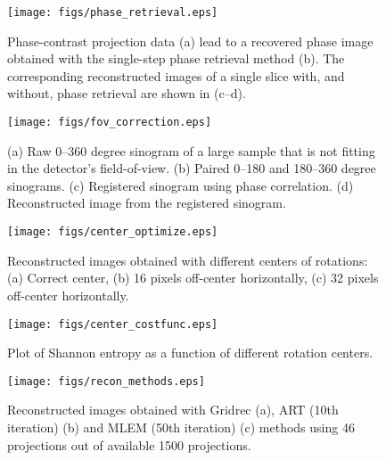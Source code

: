 \documentclass[pdf]{iucr}              %
\begin{document}
\begin{figure}
\centering
\texttt{[image: figs/phase\_retrieval.eps]}
\caption{Phase-contrast projection data (a) lead to a recovered phase image obtained with the single-step phase retrieval method (b). The corresponding reconstructed images of a single slice with, and without, phase retrieval are shown in (c--d).}
\label{fig:ProcessPhase}
\end{figure}

\begin{figure}
\centering
\texttt{[image: figs/fov\_correction.eps]}
\caption{(a) Raw 0--360 degree sinogram of a large sample that is not fitting in the detector's field-of-view. (b) Paired 0--180 and 180--360 degree sinograms. (c) Registered sinogram using phase correlation. (d) Reconstructed image from the registered sinogram.}
\label{fov_correction}
\end{figure}

\begin{figure}
\centering
\texttt{[image: figs/center\_optimize.eps]}
\caption{Reconstructed images obtained with different centers of rotations: (a) Correct center, (b) 16 pixels  off-center horizontally, (c) 32 pixels off-center horizontally.}
\label{OptimizeCenter1}
\end{figure}

\begin{figure}
\centering
\texttt{[image: figs/center\_costfunc.eps]}
\caption{Plot of Shannon entropy as a function of different rotation centers. }
\label{fig:OptimizeCenter2}
\end{figure}


\begin{figure}
\centering
\texttt{[image: figs/recon\_methods.eps]}
\caption{Reconstructed images obtained with Gridrec (a), ART (10th iteration) (b) and MLEM (50th iteration) (c) methods using 46 projections out of available 1500 projections.}
\label{recon_methods}
\end{figure}
\end{document}
